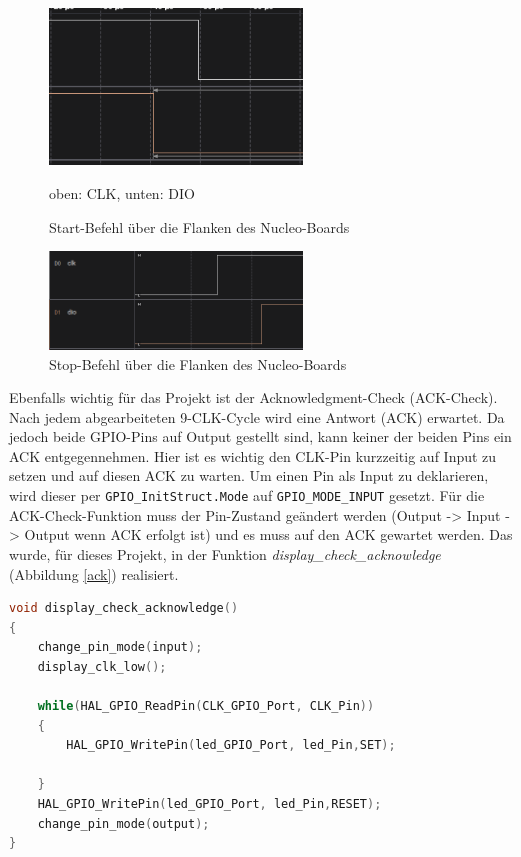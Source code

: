 \documentclass[11pt,a4paper,titlepage]{article}
\begin{document}
\vspace{0.7cm}
\begin{figure}[h]
    \begin{center}
        \includegraphics[width=0.6\textwidth]{Bilder/start_cmd.png}
        \caption{Start-Befehl über die Flanken des Nucleo-Boards}
        {\small oben: CLK, unten: DIO}
        \label{start}
    \end{center}
\end{figure}
\begin{figure}
    \begin{center}
        \includegraphics[width=0.6\textwidth]{Bilder/stop_command.png}
        \caption{Stop-Befehl über die Flanken des Nucleo-Boards}
        \label{stop}
    \end{center}
\end{figure}

\newpage

Ebenfalls wichtig für das Projekt ist der Acknowledgment-Check (ACK-Check).
Nach jedem abgearbeiteten 9-CLK-Cycle wird eine Antwort (ACK) erwartet.
Da jedoch beide GPIO-Pins auf Output gestellt sind, kann keiner der beiden Pins ein ACK entgegennehmen.
Hier ist es wichtig den CLK-Pin kurzzeitig auf Input zu setzen und auf diesen ACK zu warten.
Um einen Pin als Input zu deklarieren, wird dieser per \texttt{GPIO\_InitStruct.Mode} auf \texttt{GPIO\_MODE\_INPUT} gesetzt.
Für die ACK-Check-Funktion muss der Pin-Zustand geändert werden (Output -> Input -> Output wenn ACK erfolgt ist)
und es muss auf den ACK gewartet werden. Das wurde, für dieses Projekt,
in der Funktion \textit{display\_check\_acknowledge} (Abbildung \cref{ack}) realisiert.


\begin{lstlisting}[language=C, label={ack}, caption={Funktion zum Überprüfen des Acknowledgements}]
void display_check_acknowledge()
{
	change_pin_mode(input);
	display_clk_low();

	while(HAL_GPIO_ReadPin(CLK_GPIO_Port, CLK_Pin))
	{
		HAL_GPIO_WritePin(led_GPIO_Port, led_Pin,SET);
		
	}
	HAL_GPIO_WritePin(led_GPIO_Port, led_Pin,RESET);
	change_pin_mode(output);
}
\end{lstlisting}
\end{document}
